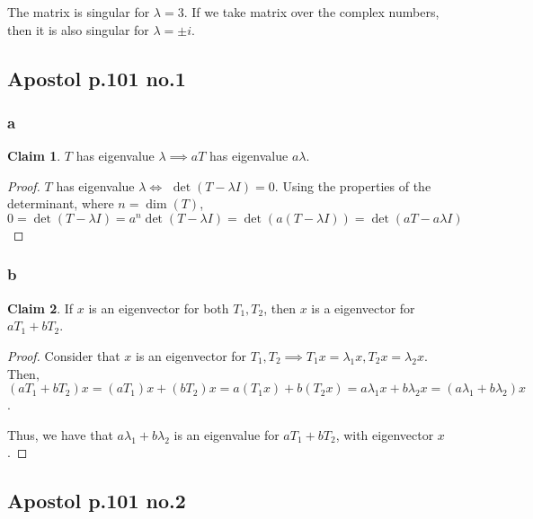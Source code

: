 \documentclass[12pt,letterpaper]{article}
\theoremstyle{definition}
\newtheorem*{claim}{Claim}
\begin{document}
The matrix is singular for $\lambda  = 3$. If we take matrix over the complex
numbers, then it is also singular for $\lambda = \pm i$.

\subsection*{Apostol p.101 no.1}

\subsubsection*{a}

\begin{claim}
  $T$ has eigenvalue $\lambda \implies aT$ has eigenvalue $a\lambda$.
\end{claim}

\begin{proof}

    
  $T$ has eigenvalue $\lambda \iff$ $\det(T - \lambda I) = 0$. Using the
  properties of the determinant, where $n = \dim(T)$,
  \[
    0 = \det(T - \lambda I) = a^n \det(T - \lambda I)= \det(a(T - \lambda I)) = \det(aT - a\lambda I)
  \]
\end{proof}

\subsubsection*{b}

\begin{claim}
  If $x$ is an eigenvector for both $T_1, T_2$, then $x$ is a eigenvector for
  $aT_1 + bT_2$. 
\end{claim}

\begin{proof}
  Consider that $x$ is an eigenvector for $T_1, T_2 \implies T_1x = \lambda_1x,
  T_2x = \lambda_2x$. Then,  $(aT_1 + bT_2)x = (aT_1)x + (bT_2)x = a(T_1x) +
  b(T_2x) = a\lambda_1x + b\lambda_2x = (a\lambda_1 + b\lambda_2)x$.

  Thus, we have that $a\lambda_1 + b\lambda_2$ is an eigenvalue for $aT_1 +
  bT_2$, with eigenvector $x$.
\end{proof}

\subsection*{Apostol p.101 no.2}
\end{document}
